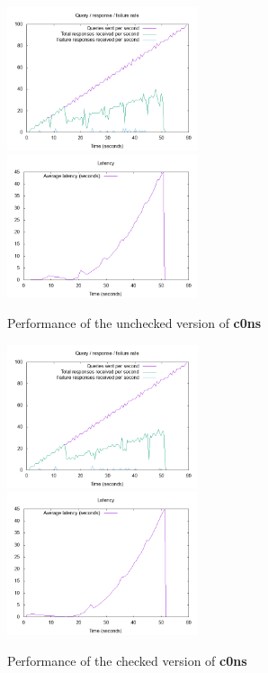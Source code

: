 \documentclass{article}
\newcommand\Kwd[1]{{\sffamily\bfseries{#1}}}
\begin{document}
\begin{figure}[h]
    \includegraphics[width=0.5\textwidth]{unchecked_rate.png}
    \includegraphics[width=0.5\textwidth]{unchecked_latency.png}
    \caption{Performance of the unchecked version of \Kwd{c0ns}}\label{fig:unchecked-perf}
\end{figure}

\begin{figure}[h]
    \includegraphics[width=0.5\textwidth]{checked_rate.png}
    \includegraphics[width=0.5\textwidth]{checked_latency.png}
    \caption{Performance of the checked version of \Kwd{c0ns}}\label{fig:checked-perf}
\end{figure}
\end{document}
